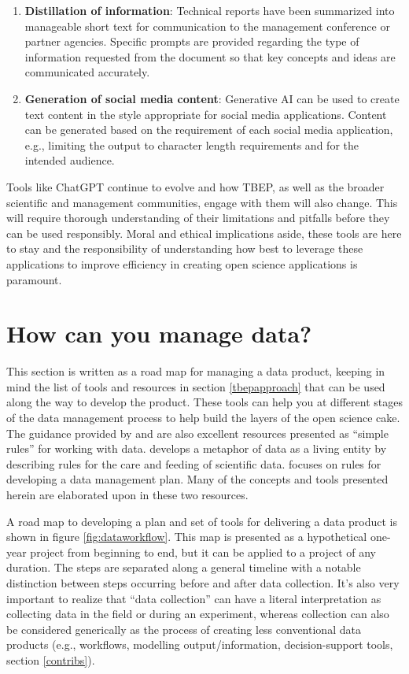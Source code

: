 \documentclass[
]{book}
\providecommand{\tightlist}{%
  \setlength{\itemsep}{0pt}\setlength{\parskip}{0pt}}
\begin{document}
\begin{enumerate}
\def\labelenumi{\arabic{enumi}.}
\tightlist
\item
  \textbf{Distillation of information}: Technical reports have been summarized into manageable short text for communication to the management conference or partner agencies. Specific prompts are provided regarding the type of information requested from the document so that key concepts and ideas are communicated accurately.
\item
  \textbf{Generation of social media content}: Generative AI can be used to create text content in the style appropriate for social media applications. Content can be generated based on the requirement of each social media application, e.g., limiting the output to character length requirements and for the intended audience.
\end{enumerate}

Tools like ChatGPT continue to evolve and how TBEP, as well as the broader scientific and management communities, engage with them will also change. This will require thorough understanding of their limitations and pitfalls before they can be used responsibly. Moral and ethical implications aside, these tools are here to stay and the responsibility of understanding how best to leverage these applications to improve efficiency in creating open science applications is paramount.

\section{How can you manage data?}\label{howyou}

This section is written as a road map for managing a data product, keeping in mind the list of tools and resources in section \ref{tbepapproach} that can be used along the way to develop the product. These tools can help you at different stages of the data management process to help build the layers of the open science cake. The guidance provided by \citet{Goodman14} and \citet{Michener15} are also excellent resources presented as ``simple rules'' for working with data. \citet{Goodman14} develops a metaphor of data as a living entity by describing rules for the care and feeding of scientific data. \citet{Michener15} focuses on rules for developing a data management plan. Many of the concepts and tools presented herein are elaborated upon in these two resources.

A road map to developing a plan and set of tools for delivering a data product is shown in figure \ref{fig:dataworkflow}. This map is presented as a hypothetical one-year project from beginning to end, but it can be applied to a project of any duration. The steps are separated along a general timeline with a notable distinction between steps occurring before and after data collection. It's also very important to realize that ``data collection'' can have a literal interpretation as collecting data in the field or during an experiment, whereas collection can also be considered generically as the process of creating less conventional data products (e.g., workflows, modelling output/information, decision-support tools, section \ref{contribs}).
\end{document}
